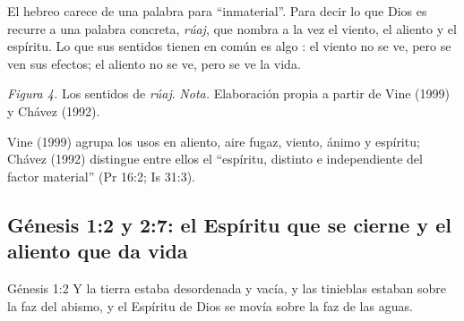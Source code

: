 El hebreo carece de una palabra para ``inmaterial''. Para decir lo que Dios es recurre a una palabra concreta,  \emph{rúaj}, que nombra a la vez el viento, el aliento y el espíritu. Lo que sus sentidos tienen en común es algo : el viento no se ve, pero se ven sus efectos; el aliento no se ve, pero se ve la vida.

\begin{center}
\par
{\footnotesize\color{gris}\textit{Figura 4.} Los sentidos de \emph{rúaj}. \textit{Nota.} Elaboración propia a partir de Vine (1999) y Chávez (1992).}
\end{center}

Vine (1999) agrupa los usos en aliento, aire fugaz, viento, ánimo y espíritu; Chávez (1992) distingue entre ellos el ``espíritu, distinto e independiente del factor material'' (Pr 16:2; Is 31:3).

\subsection{Génesis 1:2 y 2:7: el Espíritu que se cierne y el aliento que da vida}

\begin{verso}{Génesis 1:2}
Y la tierra estaba desordenada y vacía, y las tinieblas estaban sobre la faz del abismo, y el Espíritu de Dios se movía sobre la faz de las aguas.
\end{verso}


